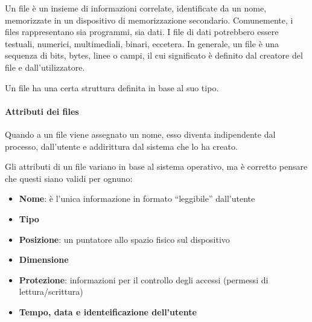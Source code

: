\documentclass[a4]{article}
\begin{document}
Un file è un insieme di informazioni correlate, identificate da un nome, memorizzate in un dispositivo di memorizzazione secondario. Comunemente, i files rappresentano sia programmi, sia dati. I file di dati potrebbero essere testuali, numerici, multimediali, binari, eccetera. In generale, un file è una sequenza di bits, bytes, linee o campi, il cui significato è definito dal creatore del file e dall'utilizzatore.

Un file ha una certa struttura definita in base al suo tipo.

\paragraph{Attributi dei files}
Quando a un file viene assegnato un nome, esso diventa indipendente dal processo, dall'utente e addirittura dal sistema che lo ha creato.

Gli attributi di un file variano in base al sistema operativo, ma è corretto pensare che questi siano validi per ognuno:
\begin{itemize}
    \item \textbf{Nome}: è l'unica informazione in formato ``leggibile'' dall'utente
    \item \textbf{Tipo}
    \item \textbf{Posizione}: un puntatore allo spazio fisico sul dispositivo
    \item \textbf{Dimensione}
    \item \textbf{Protezione}: informazioni per il controllo degli accessi (permessi di lettura/scrittura)
    \item \textbf{Tempo, data e identeificazione dell'utente}
\end{itemize}
\end{document}
